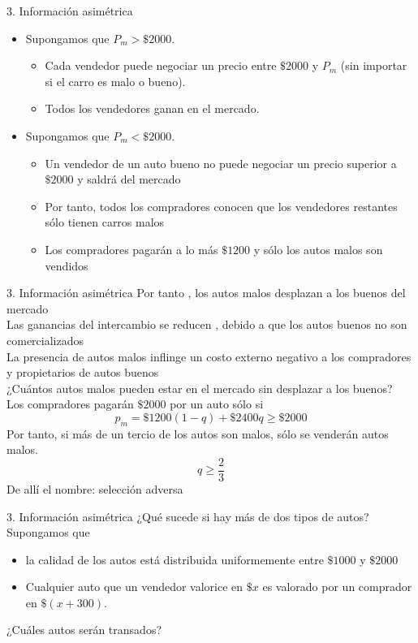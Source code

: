 \begin{frame}{3. Información asimétrica}
	\begin{itemize}
		\item Supongamos que $P_m > \$2000$.
			\begin{itemize}
				\item Cada vendedor puede negociar un precio entre $\$2000$ y $P_m$ (sin importar si el carro es malo o bueno).
				\item Todos los vendedores ganan en el mercado.
			\end{itemize}
		\item Supongamos que $P_m < \$2000$.
			\begin{itemize}
				\item Un vendedor de un auto bueno no puede negociar un precio superior a $\$2000$ y saldrá del mercado
				\item Por tanto, todos los compradores conocen que los vendedores restantes sólo tienen carros malos
				\item Los compradores pagarán a lo más $\$1200$ y sólo los autos malos son vendidos
			\end{itemize}
	\end{itemize}
\end{frame}
\begin{frame}{3. Información asimétrica}
	Por tanto , los autos malos desplazan a los buenos del mercado \\[0.3cm]
	Las ganancias del intercambio se reducen , debido a que los autos buenos no son comercializados\\[0.3cm]
	La presencia de autos malos inflinge un costo externo negativo a los compradores y propietarios de autos buenos\\[0.3cm]
	¿Cuántos autos malos pueden estar en el mercado sin desplazar a los buenos?\\[0.3cm]
	Los compradores pagarán $\$2000$ por un auto sólo si
		$$ p_m = \$1200(1-q)+\$2400q \geq \$2000 $$
	Por tanto, si más de un tercio de los autos son malos, sólo se venderán autos malos.
		$$ q \geq \frac{2}{3} $$
	De allí el nombre: selección adversa
\end{frame}
\begin{frame}{3. Información asimétrica}
	¿Qué sucede si hay más de dos tipos de autos?\\[0.3cm]
	Supongamos que
		\begin{itemize}
			\item la calidad de los autos está distribuida uniformemente entre $\$1000$ y $\$2000$
			\item Cualquier auto que un vendedor valorice en $\$x$ es valorado por un comprador en $\$(x+300)$.
		\end{itemize}
	¿Cuáles autos serán transados?
\end{frame}
